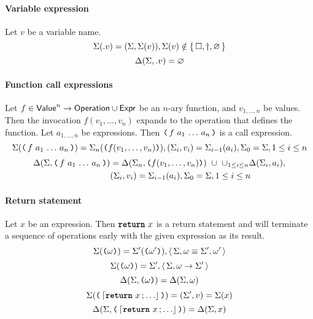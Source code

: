 \paragraph{Variable expression}
Let $v$ be a variable name.
$$
\Sigma({.}v) = (\Sigma, \Sigma(v)),
	\Sigma(v) \notin \left\{\,\Box, \dagger, \varnothing\,\right\}
$$
$$
\Delta(\Sigma, {.}v) = \varnothing
$$

\paragraph{Function call expressions}
Let $f \in \mathsf{Value}^n \to \mathsf{Operation} \cup \mathsf{Expr}$ be an $n$-ary function, and $v_{1, \ldots, n}$ be values.
Then the invocation $f(v_1, \ldots, v_n)$ expands to the operation that defines the function.
Let $a_{1, \ldots, n}$ be expressions.
Then $\opexp{f}{a_1}{\ldots}{a_n}$ is a call expression.
$$
\Sigma(\opexp{f}{a_1}{\ldots}{a_n}) = \Sigma_n(\ttlparen f(v_1, \ldots, v_n) \ttrparen),
	(\Sigma_i, v_i) = \Sigma_{i-1}(a_i),
		\Sigma_0 = \Sigma, 1 \le i \le n
$$
\begin{equation*}
\begin{split}
\Delta(\Sigma, \opexp{f}{a_1}{\ldots}{a_n}) &=
	\Delta(\Sigma_n, \ttlparen f(v_1, \ldots, v_n) \ttrparen) ~ \cup ~ \cup_{1 \le i \le n} \Delta(\Sigma_i, a_i), \\
	&(\Sigma_i, v_i) = \Sigma_{i-1}(a_i), \Sigma_0 = \Sigma, 1 \le i \le n
\end{split}
\end{equation*}

\paragraph{Return statement}
Let $x$ be an expression.
Then $\texttt{\textbf{return}}~x$ is a return statement and will terminate a sequence of operations early with the given expression as its result.
$$
\Sigma(\texttt{(} \omega \texttt{)}) = \Sigma'(\texttt{(} \omega' \texttt{)}),
	\left\langle\, \Sigma, \omega \equiv \Sigma', \omega' \,\right\rangle
$$
$$
\Sigma(\texttt{(} \omega \texttt{)}) = \Sigma',
	\left\langle\, \Sigma, \omega \to \Sigma' \,\right\rangle
$$
$$
\Delta(\Sigma, \texttt{(} \omega \texttt{)}) = \Delta(\Sigma, \omega)
$$
$$
\Sigma(\ttlparen \stmt{\retstmt{x}}{\ldots} \ttrparen) = (\Sigma', v) = \Sigma(x)
$$
$$
\Delta(\Sigma, \ttlparen \stmt{\retstmt{x}}{\ldots} \ttrparen) = \Delta(\Sigma, x)
$$